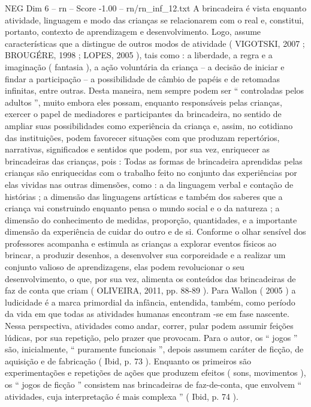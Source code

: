 \begin{textsample}{NEG Dim 6 – rn – Score -1.00 – rn/rn\_inf\_12.txt}  \label{ex:f6_neg_053}
A brincadeira é vista enquanto atividade, linguagem e modo das crianças se relacionarem com o real e, constitui, portanto, contexto de aprendizagem e desenvolvimento.
Logo, assume características que a distingue de outros modos de atividade ( VIGOTSKI, 2007 ; BROUGÉRE, 1998 ; LOPES, 2005 ), tais como : a liberdade, a regra e a imaginação ( fantasia ), a ação voluntária da criança – a decisão de iniciar e findar a participação – a possibilidade de câmbio de papéis e de retomadas infinitas, entre outras.
Desta maneira, nem sempre podem ser “ controladas pelos adultos ”, muito embora eles possam, enquanto responsáveis pelas crianças, exercer o papel de mediadores e participantes da brincadeira, no sentido de ampliar suas possibilidades como experiência da criança e, assim, no cotidiano das instituições, podem favorecer situações com que produzam repertórios, narrativas, significados e sentidos que podem, por sua vez, enriquecer as brincadeiras das crianças, pois : Todas as formas de brincadeira aprendidas pelas crianças são enriquecidas com o trabalho feito no conjunto das experiências por elas vividas nas outras dimensões, como : a da linguagem verbal e contação de histórias ; a dimensão das linguagens artísticas e também dos saberes que a criança vai construindo enquanto pensa o mundo social e o da natureza ; a dimensão do conhecimento de medidas, proporção, quantidades, e a importante dimensão da experiência de cuidar do outro e de si.
Conforme o olhar sensível dos professores acompanha e estimula as crianças a explorar eventos físicos ao brincar, a produzir desenhos, a desenvolver sua corporeidade e a realizar um conjunto valioso de aprendizagens, elas podem revolucionar o seu desenvolvimento, o que, por sua vez, alimenta os conteúdos das brincadeiras de faz de conta que criam ( OLIVEIRA, 2011, pp. 88-89 ).
Para Wallon ( 2005 ) a ludicidade é a marca primordial da infância, entendida, também, como período da vida em que todas as atividades humanas encontram -se em fase nascente.
Nessa perspectiva, atividades como andar, correr, pular podem assumir feições lúdicas, por sua repetição, pelo prazer que provocam.
Para o autor, os “ jogos ” são, inicialmente, “ puramente funcionais ”, depois assumem caráter de ficção, de aquisição e de fabricação ( Ibid, p. 73 ).
Enquanto os primeiros são experimentações e repetições de ações que produzem efeitos ( sons, movimentos ), os “ jogos de ficção ” consistem nas brincadeiras de faz-de-conta, que envolvem “ atividades, cuja interpretação é mais complexa ” ( Ibid, p. 74 ).

\end{textsample}
